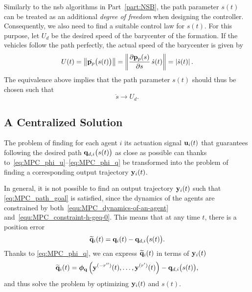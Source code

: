 Similarly to the \gls{nsb} algorithms in Part~\ref{part:NSB}, the path parameter $s(t)$ can be treated as an additional \emph{degree of freedom} when designing the controller. Consequently, we also need to find a suitable control law for $s(t)$. For this purpose, let $U_d$ be the desired speed of the barycenter of the formation. %
If the vehicles follow the path perfectly, the actual speed of the barycenter is given by
\begin{equation}
    U(t)
    =
    \left\|\dot{\mathbf{p}_p} \big( s(t) \big)\right\|
    =
    \left\|\frac{\partial \mathbf{p}_p(s)}{\partial s}\,\dot{s}(t) \right\| = \left|\dot{s}(t)\right|.
\end{equation}
The equivalence above implies that the path parameter $s(t)$ should thus be chosen such that
\begin{equation}
    \dot{s} \rightarrow U_d.
    \label{eq:MPC_param_goal}
\end{equation}



\subsection{A Centralized Solution}
\label{ssec:MPC_centralized}



The problem of finding for each agent $i$ its actuation signal $\mathbf{u}_i(t)$ that guarantees following the desired path $\mathbf{q}_{d,i} \big( s(t) \big)$ as close as possible can thanks to~\eqref{eq:MPC_phi_u}--\eqref{eq:MPC_phi_q} be transformed into the problem of finding a corresponding output trajectory $\mathbf{y}_i(t)$.

In general, it is not possible to find an output trajectory $\mathbf{y}_i(t)$ such that \eqref{eq:MPC_path_goal} is satisfied, since the dynamics of the agents are constrained by both~\eqref{equ:MPC_dynamics-of-an-agent} and~\eqref{equ:MPC_constraint-h-geq-0}. This means that at any time $t$, there is a position error
%
\begin{equation}
    \widetilde{\mathbf{q}}_i(t)
    =
    \mathbf{q}_i(t)
    -
    \mathbf{q}_{d,i} \big( s(t) \big) .
    \label{eq:MPC_q_tilde}
\end{equation}
%
Thanks to \eqref{eq:MPC_phi_q}, we can express $\widetilde{\mathbf{q}}_i(t)$ in terms of $\mathbf{y}_i(t)$
\begin{equation}
    \widetilde{\mathbf{q}}_i(t)
    =
    \bm{\phi}_{\mathbf{q}}\left(\mathbf{y}^{(-r'')}(t), \ldots, \mathbf{y}^{(r')}(t)\right)
    -
    \mathbf{q}_{d,i} \big( s(t) \big), \label{eq:MPC_y_tilde}
\end{equation}
and thus solve the problem by optimizing $\mathbf{y}_i(t)$ and $s(t)$.

